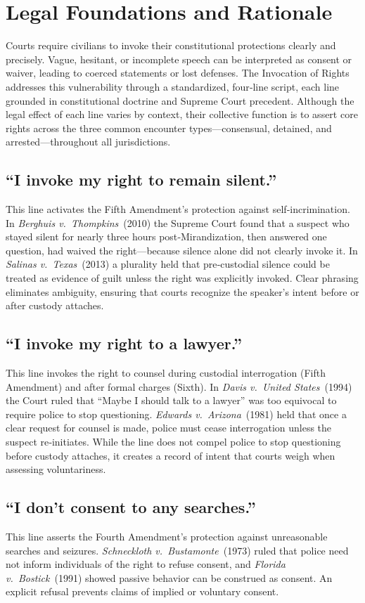 \section{Legal Foundations and Rationale}

Courts require civilians to invoke their constitutional protections clearly and precisely. Vague, hesitant, or incomplete speech can be interpreted as consent or waiver, leading to coerced statements or lost defenses. The Invocation of Rights addresses this vulnerability through a standardized, four‑line script, each line grounded in constitutional doctrine and Supreme Court precedent. Although the legal effect of each line varies by context, their collective function is to assert core rights across the three common encounter types—consensual, detained, and arrested—throughout all jurisdictions.

\subsection*{``I invoke my right to remain silent.''}
This line activates the Fifth Amendment’s protection against self‑incrimination. In \textit{Berghuis v.\ Thompkins} (2010) the Supreme Court found that a suspect who stayed silent for nearly three hours post‑Mirandization, then answered one question, had waived the right—because silence alone did not clearly invoke it. In \textit{Salinas v.\ Texas} (2013) a plurality held that pre‑custodial silence could be treated as evidence of guilt unless the right was explicitly invoked. Clear phrasing eliminates ambiguity, ensuring that courts recognize the speaker’s intent before or after custody attaches.

\subsection*{``I invoke my right to a lawyer.''}
This line invokes the right to counsel during custodial interrogation (Fifth Amendment) and after formal charges (Sixth). In \textit{Davis v.\ United States} (1994) the Court ruled that ``Maybe I should talk to a lawyer'' was too equivocal to require police to stop questioning. \textit{Edwards v.\ Arizona} (1981) held that once a clear request for counsel is made, police must cease interrogation unless the suspect re‑initiates. While the line does not compel police to stop questioning before custody attaches, it creates a record of intent that courts weigh when assessing voluntariness.

\subsection*{``I don’t consent to any searches.''}
This line asserts the Fourth Amendment’s protection against unreasonable searches and seizures. \textit{Schneckloth v.\ Bustamonte} (1973) ruled that police need not inform individuals of the right to refuse consent, and \textit{Florida v.\ Bostick} (1991) showed passive behavior can be construed as consent. An explicit refusal prevents claims of implied or voluntary consent.


